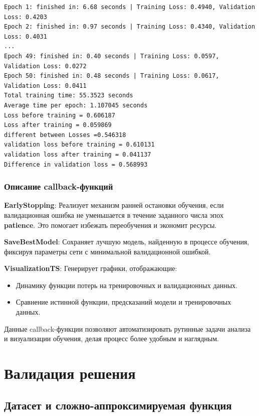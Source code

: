 \begin{lstlisting}[language=Tex, breaklines, caption=Пример получения данных от callback-функций]
Epoch 1: finished in: 6.68 seconds | Training Loss: 0.4940, Validation Loss: 0.4203
Epoch 2: finished in: 0.97 seconds | Training Loss: 0.4340, Validation Loss: 0.4031
...
Epoch 49: finished in: 0.40 seconds | Training Loss: 0.0597, Validation Loss: 0.0272
Epoch 50: finished in: 0.48 seconds | Training Loss: 0.0617, Validation Loss: 0.0411
Total training time: 55.3523 seconds
Average time per epoch: 1.107045 seconds
Loss before training = 0.606187
Loss after training = 0.059869
different between Losses =0.546318
validation loss before training = 0.610131
validation loss after training = 0.041137
Difference in validation loss = 0.568993
\end{lstlisting}

\subsubsection{Описание callback-функций}

\textbf{EarlyStopping}: Реализует механизм ранней остановки обучения, если валидационная ошибка не уменьшается в течение заданного числа эпох \textbf{patience}. Это помогает избежать переобучения и экономит ресурсы.

\textbf{SaveBestModel}: Сохраняет лучшую модель, найденную в процессе обучения, фиксируя параметры сети с минимальной валидационной ошибкой.

\textbf{VisualizationTS}: Генерирует графики, отображающие:
\begin{itemize}
    \item Динамику функции потерь на тренировочных и валидационных данных.
    \item Сравнение истинной функции, предсказаний модели и тренировочных данных.
\end{itemize}

Данные callback-функции позволяют автоматизировать рутинные задачи анализа и визуализации обучения, делая процесс более удобным и наглядным.




\section{Валидация решения}


\subsection{Датасет и сложно-аппроксимируемая функция}
\label{subsec:dataset}

